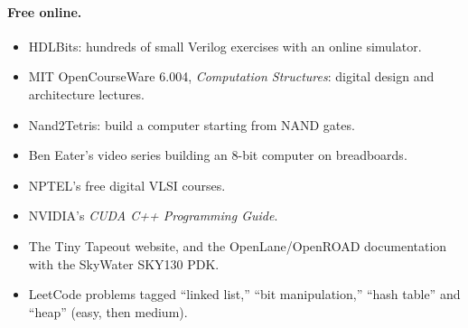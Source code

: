 \paragraph{Free online.}
\begin{itemize}
  \item HDLBits: hundreds of small Verilog exercises with an online simulator.
  \item MIT OpenCourseWare 6.004, \emph{Computation Structures}: digital design and architecture lectures.
  \item Nand2Tetris: build a computer starting from NAND gates.
  \item Ben Eater's video series building an 8-bit computer on breadboards.
  \item NPTEL's free digital VLSI courses.
  \item NVIDIA's \emph{CUDA C++ Programming Guide}.
  \item The Tiny Tapeout website, and the OpenLane/OpenROAD documentation with the SkyWater SKY130 PDK.
  \item LeetCode problems tagged ``linked list,'' ``bit manipulation,'' ``hash table'' and ``heap'' (easy, then medium).
\end{itemize}
